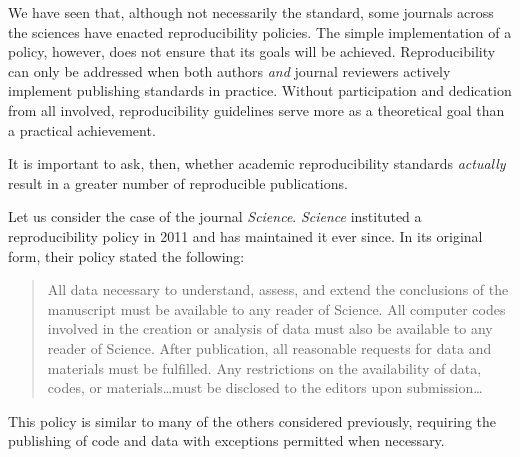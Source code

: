 \documentclass[12pt,twoside]{reedthesis}
\begin{document}
We have seen that, although not necessarily the standard, some journals across the sciences have enacted reproducibility policies. The simple implementation of a policy, however, does not ensure that its goals will be achieved. Reproducibility can only be addressed when both authors \emph{and} journal reviewers actively implement publishing standards in practice. Without participation and dedication from all involved, reproducibility guidelines serve more as a theoretical goal than a practical achievement.

It is important to ask, then, whether academic reproducibility standards \emph{actually} result in a greater number of reproducible publications.

Let us consider the case of the journal \emph{Science}. \emph{Science} instituted a reproducibility policy in 2011 and has maintained it ever since. In its original form, their policy stated the following:
\begin{quote}
All data necessary to understand, assess, and extend the conclusions of the manuscript must be available to any reader of Science. All computer codes involved in the creation or analysis of data must also be available to any reader of Science. After publication, all reasonable requests for data and materials must be fulfilled. Any restrictions on the availability of data, codes, or materials\ldots must be disclosed to the editors upon submission\ldots{}
\end{quote}
This policy is similar to many of the others considered previously, requiring the publishing of code and data with exceptions permitted when necessary.
\end{document}
